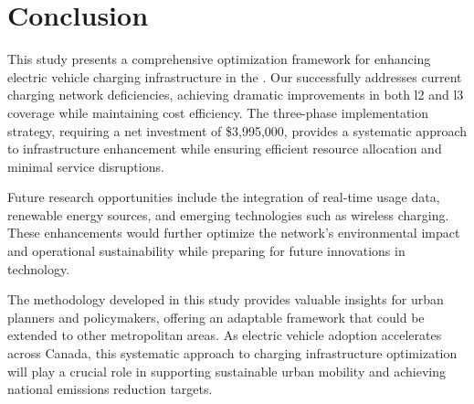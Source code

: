 \chapter{Conclusion}

This study presents a comprehensive optimization framework for enhancing electric vehicle charging infrastructure in the . Our  successfully addresses current charging network deficiencies, achieving dramatic improvements in both \gls{l2} and \gls{l3} coverage while maintaining cost efficiency. The three-phase implementation strategy, requiring a net investment of \$3,995,000, provides a systematic approach to infrastructure enhancement while ensuring efficient resource allocation and minimal service disruptions.

Future research opportunities include the integration of real-time usage data, renewable energy sources, and emerging technologies such as wireless charging. These enhancements would further optimize the network's environmental impact and operational sustainability while preparing for future innovations in  technology.

The methodology developed in this study provides valuable insights for urban planners and policymakers, offering an adaptable framework that could be extended to other metropolitan areas. As electric vehicle adoption accelerates across Canada, this systematic approach to charging infrastructure optimization will play a crucial role in supporting sustainable urban mobility and achieving national emissions reduction targets.
